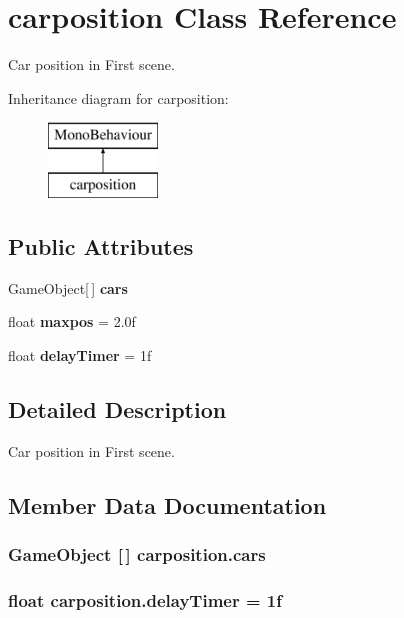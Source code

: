 \section{carposition Class Reference}
\label{classcarposition}


Car position in First scene.  


Inheritance diagram for carposition\+:\begin{figure}[H]
\begin{center}
\leavevmode
\includegraphics[height=2.000000cm]{classcarposition}
\end{center}
\end{figure}
\subsection*{Public Attributes}
\begin{DoxyCompactItemize}
\item 
Game\+Object[$\,$] {\bf cars}
\item 
float {\bf maxpos} = 2.\+0f
\item 
float {\bf delay\+Timer} = 1f
\end{DoxyCompactItemize}


\subsection{Detailed Description}
Car position in First scene. 



\subsection{Member Data Documentation}
\subsubsection[{cars}]{\setlength{\rightskip}{0pt plus 5cm}Game\+Object [$\,$] carposition.\+cars}\label{classcarposition_a61d1bd8bc04d6cd98de2da93d70add57}
\subsubsection[{delay\+Timer}]{\setlength{\rightskip}{0pt plus 5cm}float carposition.\+delay\+Timer = 1f}\label{classcarposition_a3ed65e3e7144a56e0e0f487210ab86e0}
